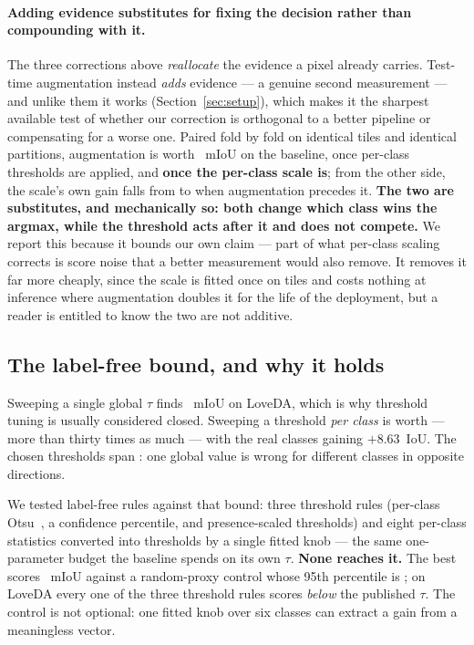 \documentclass[10pt,a4paper]{article}                        %
\newcommand{\best}[1]{\textbf{#1}}
\begin{document}
\paragraph{Adding evidence substitutes for fixing the decision rather than
compounding with it.} The three corrections above \emph{reallocate} the evidence
a pixel already carries. Test-time augmentation instead \emph{adds} evidence ---
a genuine second measurement --- and unlike them it works
(Section~\ref{sec:setup}), which makes it the sharpest available test of whether
our correction is orthogonal to a better pipeline or compensating for a worse
one. Paired fold by fold on identical tiles and identical partitions,
augmentation is worth \ttaAtA{}~mIoU on the baseline, \ttaAtB{} once per-class
thresholds are applied, and \best{\ttaAtC{} once the per-class scale is}; from
the other side, the scale's own gain falls from \ttaScaleWithout{} to
\ttaScaleWith{} when augmentation precedes it. \best{The two are substitutes, and
mechanically so: both change which class wins the argmax, while the threshold
acts after it and does not compete.} We report this because it bounds our own
claim --- part of what per-class scaling corrects is score noise that a better
measurement would also remove. It removes it far more cheaply, since the scale is
fitted once on \calibTiles{} tiles and costs nothing at inference where
augmentation doubles it for the life of the deployment, but a reader is entitled
to know the two are not additive.

\subsection{The label-free bound, and why it holds}
\label{sec:bound}

Sweeping a single global $\tau$ finds \globalOracle{}~mIoU on LoveDA, which is why
threshold tuning is usually considered closed. Sweeping a threshold \emph{per
class} is worth \oracleBound{} --- more than thirty times as much --- with the
real classes gaining $+8.63$~IoU. The chosen thresholds span \eeSpread{}: one
global value is wrong for different classes in opposite directions.

We tested \nAttempts{} label-free rules against that bound: three threshold rules
(per-class Otsu~\cite{otsu}, a confidence percentile, and presence-scaled
thresholds) and
eight per-class statistics converted into thresholds by a single fitted knob ---
the same one-parameter budget the baseline spends on its own $\tau$. \best{None
reaches it.} The best scores \proxyBest{}~mIoU against a random-proxy control
whose 95th percentile is \proxyCtrl{}; on LoveDA every one of the three threshold
rules scores \emph{below} the published $\tau$. The control is not optional: one
fitted knob over six classes can extract a gain from a meaningless vector.
\end{document}
